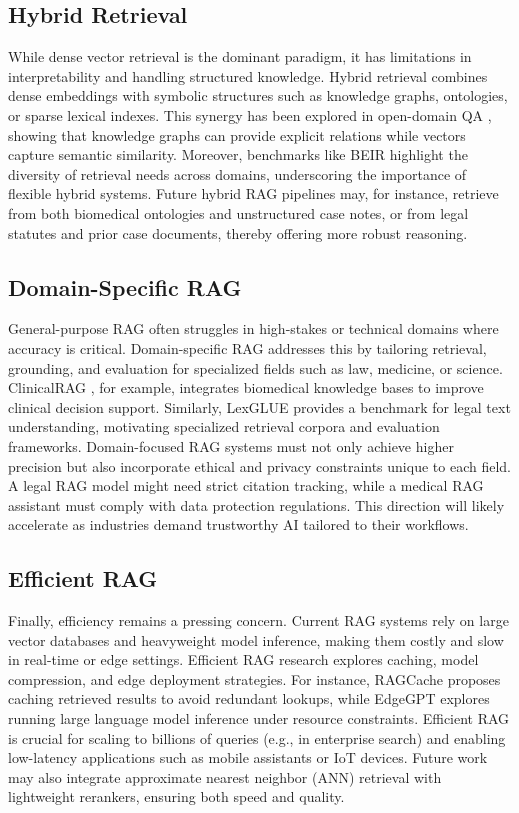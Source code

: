 \documentclass[conference]{IEEEtran}
\begin{document}
\subsection{Hybrid Retrieval}
While dense vector retrieval is the dominant paradigm, it has limitations in interpretability and handling structured knowledge. Hybrid retrieval combines dense embeddings with symbolic structures such as knowledge graphs, ontologies, or sparse lexical indexes. This synergy has been explored in open-domain QA \cite{sun2020knowledge}, showing that knowledge graphs can provide explicit relations while vectors capture semantic similarity. Moreover, benchmarks like BEIR \cite{thakur2021beir} highlight the diversity of retrieval needs across domains, underscoring the importance of flexible hybrid systems. Future hybrid RAG pipelines may, for instance, retrieve from both biomedical ontologies and unstructured case notes, or from legal statutes and prior case documents, thereby offering more robust reasoning.

\subsection{Domain-Specific RAG}
General-purpose RAG often struggles in high-stakes or technical domains where accuracy is critical. Domain-specific RAG addresses this by tailoring retrieval, grounding, and evaluation for specialized fields such as law, medicine, or science. ClinicalRAG \cite{moradi2023clinicalrag}, for example, integrates biomedical knowledge bases to improve clinical decision support. Similarly, LexGLUE \cite{chalkidis2023lexglue} provides a benchmark for legal text understanding, motivating specialized retrieval corpora and evaluation frameworks. Domain-focused RAG systems must not only achieve higher precision but also incorporate ethical and privacy constraints unique to each field. A legal RAG model might need strict citation tracking, while a medical RAG assistant must comply with data protection regulations. This direction will likely accelerate as industries demand trustworthy AI tailored to their workflows.

\subsection{Efficient RAG}
Finally, efficiency remains a pressing concern. Current RAG systems rely on large vector databases and heavyweight model inference, making them costly and slow in real-time or edge settings. Efficient RAG research explores caching, model compression, and edge deployment strategies. For instance, RAGCache \cite{tao2023ragcache} proposes caching retrieved results to avoid redundant lookups, while EdgeGPT \cite{ren2023edgegpt} explores running large language model inference under resource constraints. Efficient RAG is crucial for scaling to billions of queries (e.g., in enterprise search) and enabling low-latency applications such as mobile assistants or IoT devices. Future work may also integrate approximate nearest neighbor (ANN) retrieval with lightweight rerankers, ensuring both speed and quality.
\end{document}
